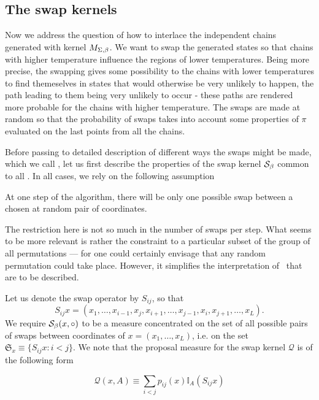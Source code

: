 	\subsection*{The swap kernels}

Now we address the question of how to interlace the independent chains generated with kernel $M_{\Sigma,\beta}$. We want to swap the generated states so that chains with higher temperature influence the regions of lower temperatures. Being more precise, the swapping gives some possibility to the chains with lower temperatures to find themeselves in states that would otherwise be very unlikely to happen, the path leading to them being very unlikely to occur - these paths are rendered more probable for the chains with higher temperature. The swaps are made at random so that the probability of swaps takes into account some properties of $\pi$ evaluated on the last points from all the chains. 

Before passing to detailed description of different ways the swaps might be made, which we call \strats, let us first describe the properties of the swap kernel $\mathcal{S}_{\beta}$ common to all \strats. In all cases, we rely on the following assumption

\begin{assumptions}[resume]
	\item At one step of the algorithm, there will be only one possible swap between a chosen at random pair of coordinates.
\end{assumptions}

The restriction here is not so much in the number of swaps per step. What seems to be more relevant is rather the constraint to a particular subset of the group of all permutations --- for one could certainly envisage that any random permutation could take place. However, it simplifies the interpretation of \strats\, that are to be described. 

Let us denote the swap operator by $S_{ij}$, so that 
$$S_{ij} x = (x_1, \dots, x_{i-1}, x_j, x_{i+1}, \dots, x_{j-1}, x_i, x_{j+1}, \dots, x_L).$$ 
We require $\mathcal{S}_{\beta}(x, \circ )$ to be a measure concentrated on the set of all possible pairs of swaps between coordinates of $x = (x_1, \dots, x_L)$, i.e. on the set $\mathfrak{S}_x \equiv \{ S_{ij}x : i < j  \}$. We note that the proposal measure for the swap kernel $\mathcal{Q}$ is of the following form 

\begin{equation*}
	\mathcal{Q}(x, A) \equiv \underset{i < j}{\sum} p_{ij}(x) \mathbb{I}_A (S_{ij} x)
\end{equation*}	 

